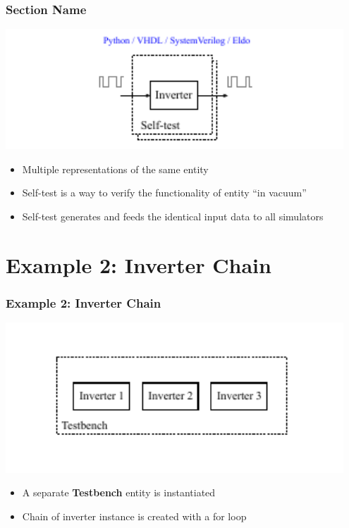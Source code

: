 \documentclass[logo=bluequo,normaltitle]{aaltoslides}
\newcommand{\sectname}{Section Name}
\begin{document}
\begin{frame}[t]
    \frametitle{\sectname}
    \centering
    \includegraphics[width=0.95\textwidth]{Pics/inverter_single_2}
    \begin{itemize}
        \item Multiple representations of the same entity
        \item Self-test is a way to verify the functionality of entity ``in
            vacuum''
        \item Self-test generates and feeds the identical input
            data to all simulators
    \end{itemize}
\end{frame}

\renewcommand{\sectname}{Example 2: Inverter Chain}
\section{\sectname}
\begin{frame}[t]
    \frametitle{\sectname}
    \centering
    \includegraphics[width=0.95\textwidth]{Pics/inverter_chain_0}
    \begin{itemize}
        \item A separate \textbf{Testbench} entity is instantiated
        \item Chain of inverter instance is created with a for loop
    \end{itemize}
\end{frame}
\end{document}
